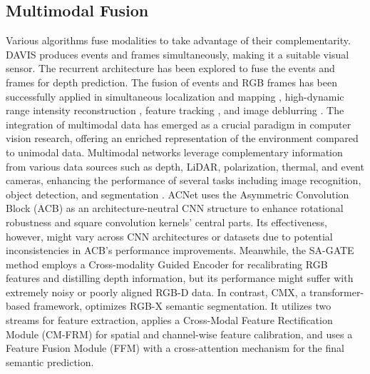 \documentclass[lettersize,journal]{IEEEtran}
\begin{document}
\subsection{\textbf{Multimodal Fusion}}
Various algorithms fuse modalities to take advantage of their complementarity. DAVIS produces events and frames simultaneously, making it a suitable visual sensor. The recurrent architecture \cite{Gehrig2021CombiningPrediction} has been explored to fuse the events and frames for depth prediction. The fusion of events and RGB frames has been successfully applied in simultaneous localization and mapping \cite{Zhu2018UnsupervisedEgomotion}, high-dynamic range intensity reconstruction \cite{Tomy2017FusingConditions}, feature tracking \cite{Gehrig2018AsynchronousFrames}, and image deblurring \cite{LiyuanPan2019BringingCamera}. The integration of multimodal data has emerged as a crucial paradigm in computer vision research, offering an enriched representation of the environment compared to unimodal data. Multimodal networks leverage complementary information from various data sources such as depth, LiDAR, polarization, thermal, and event cameras, enhancing the performance of several tasks including image recognition, object detection, and segmentation \cite{Huang2023AnRecognition, Qiu2023HierarchicalFeatures}. ACNet uses the Asymmetric Convolution Block (ACB) as an architecture-neutral CNN structure to enhance rotational robustness and square convolution kernels' central parts. Its effectiveness, however, might vary across CNN architectures or datasets due to potential inconsistencies in ACB's performance improvements. Meanwhile, the SA-GATE method employs a Cross-modality Guided Encoder for recalibrating RGB features and distilling depth information, but its performance might suffer with extremely noisy or poorly aligned RGB-D data. In contrast, CMX, a transformer-based framework, optimizes RGB-X semantic segmentation. It utilizes two streams for feature extraction, applies a Cross-Modal Feature Rectification Module (CM-FRM) for spatial and channel-wise feature calibration, and uses a Feature Fusion Module (FFM) with a cross-attention mechanism for the final semantic prediction.
\end{document}
